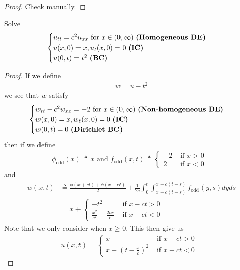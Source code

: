 \documentclass{report}
\begin{document}
\begin{proof}
Check manually. 
\end{proof}
\begin{question}{}{}
Solve 
\begin{align*}
\begin{cases}
  u_{tt}=c^2u_{xx}\text{ for }x\in (0,\infty)\text{ \textbf{(Homogeneous DE)} } \\
  u(x,0)=x,u_t(x,0)=0\text{ \textbf{(IC)} }\\
  u(0,t)=t^2\text{ \textbf{(BC)} }
\end{cases}
\end{align*}
\end{question}
\begin{proof}
If we define 
\begin{align*}
w=u-t^2
\end{align*}
we see that $w$ satisfy 
\begin{align*}
\begin{cases}
  w_{tt}-c^2w_{xx}=-2\text{ for }x\in (0,\infty)\text{ \textbf{(Non-homogeneous DE)} } \\
  w(x,0)=x,w_t(x,0)=0\text{ \textbf{(IC)} }\\
  w(0,t)=0\text{ \textbf{(Dirichlet BC)} }
\end{cases}
\end{align*}
then if we define 
\begin{align*}
\phi_{\operatorname{odd}}(x)\triangleq x\text{ and }f_{\operatorname{odd}}(x,t)\triangleq \begin{cases}
  -2& \text{ if $x>0$ }\\
  2& \text{ if $x<0$ }
\end{cases} 
\end{align*}
and 
\begin{align*}
  w(x,t)&\triangleq  \frac{\phi (x+ct)+ \phi (x-ct)}{2} + \frac{1}{2c}\int_0^t \int^{x+c(t-s)}_{x-c(t-s)} f_{\operatorname{odd}}(y,s)dyds  \\
  &= x+  \begin{cases}
   -t^2& \text{ if $x-ct>0$ }\\
    \frac{x^2}{c^2}-\frac{2tx}{c}& \text{ if $x-ct<0$ }
  \end{cases}
\end{align*}
Note that we only consider when $x\geq 0$. This then give us 
\begin{align*}
u(x,t)= \begin{cases}
  x &\text{ if $x-ct>0$ }\\
  x+ (t-\frac{x}{c})^2 &\text{ if $x-ct<0$ }
\end{cases}
\end{align*}
\end{proof}
\end{document}
